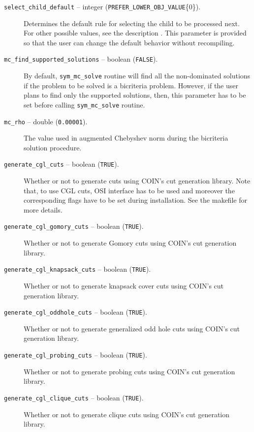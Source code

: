 \begin{description}
\item[{\tt select\_child\_default} -- integer 
({\tt PREFER\_LOWER\_OBJ\_VALUE}\{0\}).]
Determines the default rule for selecting the child to be processed
next. For other possible values, see the description . This
parameter is provided so that the user can change the default behavior
without recompiling.

\item[{\tt mc\_find\_supported\_solutions} -- boolean ({\tt FALSE}).]
By default, {\tt sym\_mc\_solve} routine will find all the non-dominated 
solutions if the problem to be solved is 
a bicriteria problem. However, if the user plans to find only the supported 
solutions, then, this parameter has to be set before 
calling {\tt sym\_mc\_solve} routine. 

\item[{\tt mc\_rho} -- double ({\tt 0.00001}).]
The value used in augmented Chebyshev norm during the bicriteria 
solution procedure.

\item[{\tt generate\_cgl\_cuts} -- boolean ({\tt TRUE}).]
Whether or not to generate cuts using COIN's cut generation library. 
Note that, to use CGL cuts, OSI interface has to be used and moreover the 
corresponding flags have to be set during installation. See the makefile for 
more details.

\item[{\tt generate\_cgl\_gomory\_cuts} -- boolean ({\tt TRUE}).]
Whether or not to generate Gomory cuts using COIN's cut generation library. 

\item[{\tt generate\_cgl\_knapsack\_cuts} -- boolean ({\tt TRUE}).]
Whether or not to generate knapsack cover cuts using COIN's cut generation 
library. 

\item[{\tt generate\_cgl\_oddhole\_cuts} -- boolean ({\tt TRUE}).]
Whether or not to generate generalized odd hole cuts using COIN's cut 
generation library. 

\item[{\tt generate\_cgl\_probing\_cuts} -- boolean ({\tt TRUE}).]
Whether or not to generate probing cuts using COIN's cut generation library. 

\item[{\tt generate\_cgl\_clique\_cuts} -- boolean ({\tt TRUE}).]
Whether or not to generate clique cuts using COIN's cut generation library. 


\end{description}
